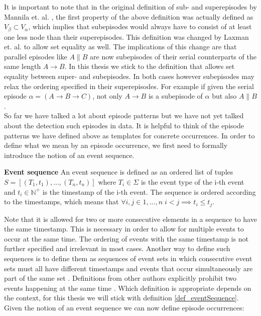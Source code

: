 It is important to note that in the original definition of sub- and superepisodes by Mannila et. al. \cite{mannila1995discovering}, the first property of the above definition was actually defined as $V_\beta \subset V_\alpha$, which implies that subepisodes would always have to consist of at least one less node than their superepisodes. This definition was changed by Laxman et. al. \cite{laxman2007fast} to allow set equality as well. The implications of this change are that parallel episodes like $A \| B$ are now subepisodes of their serial counterparts of the same length $A \rightarrow B$. In this thesis we stick to the definition that allows set equality between super- and subepisodes. In both cases however subepisodes may relax the ordering specified in their superepisodes. For example if given the serial episode $\alpha =( A \rightarrow B \rightarrow C )$, not only $A \rightarrow B$ is a subepisode of $\alpha$ but also $A \| B$. \\
So far we have talked a lot about episode patterns but we have not yet talked about the detection such episodes in data. It is helpful to think of the episode patterns we have defined above as templates for concrete occurrences. In order to define what we mean by an episode occurrence, we first need to formally introduce the notion of an event sequence.

\begin{mydef}
\label{def_eventSequence}
\textbf{Event sequence} An event sequence is defined as an ordered list of tuples $S = [ (T_1,t_1),..., (T_n,t_n) ] $ where $T_i \in \Sigma$ is the event type of the i-th event and $t_i \in \mathbb{N}^+$ is the timestamp of the i-th event. The sequence is ordered according to the timestamps, which means that $\forall i,j \in {1,...,n} \; i<j \implies t_i \leq t_j$. \cite{mannila1997discovery} %
\end{mydef}

Note that it is allowed for two or more consecutive elements in a sequence to have the same timestamp. This is necessary in order to allow for multiple events to occur at the same time. The ordering of events with the same timestamp is not further specified and irrelevant in most cases. Another way to define such sequences is to define them as sequences of event sets in which consecutive event sets must all have different timestamps and events that occur simultaneously are part of the same set \cite{bathoorn2007finding}. Definitions from other authors explicitly prohibit two events happening at the same time \cite{baumgarten2003tree}. Which definition is appropriate depends on the context, for this thesis we will stick with definition \ref{def_eventSequence}. \\
Given the notion of an event sequence we can now define episode occurrences:

